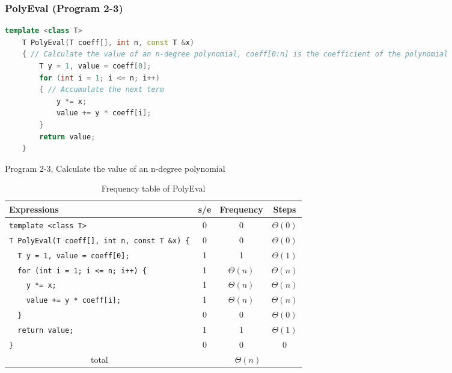 \documentclass{article}
\begin{document}
\subsubsection{PolyEval (Program 2-3)}
\begin{lstlisting}[language=C++]
    template <class T>
    T PolyEval(T coeff[], int n, const T &x)
    { // Calculate the value of an n-degree polynomial, coeff[0:n] is the coefficient of the polynomial
        T y = 1, value = coeff[0];
        for (int i = 1; i <= n; i++)
        { // Accumulate the next term
            y *= x;
            value += y * coeff[i];
        }
        return value;
    }
\end{lstlisting}
\begin{center}
    Program 2-3, Calculate the value of an n-degree polynomial
\end{center}
\begin{table}[H]
    \centering
    \begin{tabular}{|l|c|c|c|}
        \hline
        Expressions                                       & s/e                               & Frequency   & Steps       \\
        \hline
        \verb|template <class T>|                         & 0                                 & 0           & $\Theta(0)$ \\
        \verb|T PolyEval(T coeff[], int n, const T &x) {| & 0                                 & 0           & $\Theta(0)$ \\
        \verb|  T y = 1, value = coeff[0];|               & 1                                 & 1           & $\Theta(1)$ \\
        \verb|  for (int i = 1; i <= n; i++) {|           & 1                                 & $\Theta(n)$ & $\Theta(n)$ \\
        \verb|    y *= x;|                                & 1                                 & $\Theta(n)$ & $\Theta(n)$ \\
        \verb|    value += y * coeff[i];|                 & 1                                 & $\Theta(n)$ & $\Theta(n)$ \\
        \verb|  }|                                        & 0                                 & 0           & $\Theta(0)$ \\
        \verb|  return value;|                            & 1                                 & 1           & $\Theta(1)$ \\
        \verb|}|                                          & 0                                 & 0           & 0           \\
        \hline
        \multicolumn{1}{|c|}{total}                       & \multicolumn{3}{|c|}{$\Theta(n)$}                             \\
        \hline
    \end{tabular}
    \caption{Frequency table of PolyEval}
\end{table}
\end{document}

